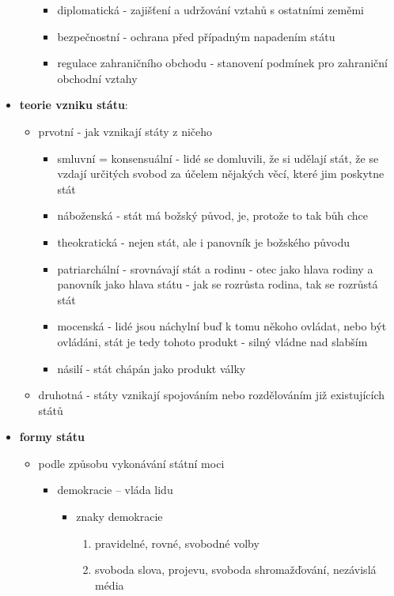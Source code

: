 \documentclass{article}
\begin{document}
\begin{itemize}
\begin{itemize}
    \begin{itemize}
      \item diplomatická - zajišťení a udržování vztahů s ostatními zeměmi
      \item bezpečnostní - ochrana před případným napadením státu
      \item regulace zahraničního obchodu - stanovení podmínek pro zahraniční obchodní vztahy
    \end{itemize}
  \end{itemize}
  \item \textbf{teorie vzniku státu}:
  \begin{itemize}
    \item prvotní - jak vznikají státy z ničeho
    \begin{itemize}
      \item smluvní = konsensuální - lidé se domluvili, že si udělají stát, že se vzdají určitých svobod za účelem nějakých věcí, které jim poskytne stát
      \item náboženská - stát má božský původ, je, protože to tak bůh chce
      \item theokratická - nejen stát, ale i panovník je božského původu
      \item patriarchální - srovnávají stát a rodinu - otec jako hlava rodiny a panovník jako hlava státu - jak se rozrůsta rodina, tak se rozrůstá stát
      \item mocenská - lidé jsou náchylní buď k tomu někoho ovládat, nebo být ovládáni, stát je tedy tohoto produkt - silný vládne nad slabším
      \item násilí - stát chápán jako produkt války
    \end{itemize}
    \item druhotná - státy vznikají spojováním nebo rozdělováním již existujících států
  \end{itemize}
  \item \textbf{formy státu}
  \begin{itemize}
    \item podle způsobu vykonávání státní moci
    \begin{itemize}
      \item demokracie -- vláda lidu
      \begin{itemize}
        \item znaky demokracie
        \begin{enumerate}
          \item pravidelné, rovné, svobodné volby
          \item svoboda slova, projevu, svoboda shromažďování, nezávislá média

\end{enumerate}
\end{itemize}
\end{itemize}
\end{itemize}
\end{itemize}
\end{document}
